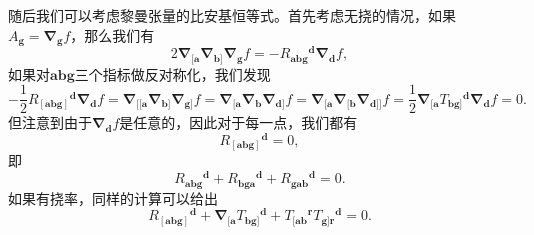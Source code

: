 随后我们可以考虑黎曼张量的比安基恒等式。首先考虑无挠的情况，如果$A_{\boldsymbol{g}} =\boldsymbol{\nabla }_{\boldsymbol{g}} f$，那么我们有
\begin{equation*}
	2\boldsymbol{\nabla }_{[\boldsymbol{a}}\boldsymbol{\nabla }_{\boldsymbol{b}]}\boldsymbol{\nabla }_{\boldsymbol{g}} f=-R{_{\boldsymbol{abg}}}^{\boldsymbol{d}}\boldsymbol{\nabla }_{\boldsymbol{d}} f,
\end{equation*}
如果对$\boldsymbol{abg}$三个指标做反对称化，我们发现
\begin{equation*}
	-\frac{1}{2} R{_{[\boldsymbol{abg}]}}^{\boldsymbol{d}}\boldsymbol{\nabla }_{\boldsymbol{d}} f=\boldsymbol{\nabla }_{[[\boldsymbol{a}}\boldsymbol{\nabla }_{\boldsymbol{b}]}\boldsymbol{\nabla }_{\boldsymbol{g}]} f=\boldsymbol{\nabla }_{[\boldsymbol{a}}\boldsymbol{\nabla }_{\boldsymbol{b}}\boldsymbol{\nabla }_{\boldsymbol{d}]} f=\boldsymbol{\nabla }_{[\boldsymbol{a}}\boldsymbol{\nabla }_{[\boldsymbol{b}}\boldsymbol{\nabla }_{\boldsymbol{d}]]} f=\frac{1}{2}\boldsymbol{\nabla }_{[\boldsymbol{a}} T{_{\boldsymbol{bg}]}}^{\boldsymbol{d}}\boldsymbol{\nabla }_{\boldsymbol{d}} f=0.
\end{equation*}
但注意到由于$\boldsymbol{\nabla }_{\boldsymbol{d}} f$是任意的，因此对于每一点，我们都有
\begin{equation}
	R{_{[\boldsymbol{abg}]}}^{\boldsymbol{d}} =0,
	\label{eq:5.7}
\end{equation}
即
\begin{equation*}
	R{_{\boldsymbol{abg}}}^{\boldsymbol{d}} +R{_{\boldsymbol{bga}}}^{\boldsymbol{d}} +R{_{\boldsymbol{gab}}}^{\boldsymbol{d}} =0.
\end{equation*}
如果有挠率，同样的计算可以给出
\begin{equation}
	R{_{[\boldsymbol{abg}]}}^{\boldsymbol{d}} +\boldsymbol{\nabla }_{[\boldsymbol{a}} T{_{\boldsymbol{bg}]}}^{\boldsymbol{d}} +T{_{[\boldsymbol{ab}}}^{\boldsymbol{r}} T{_{\boldsymbol{g}]\boldsymbol{r}}}^{\boldsymbol{d}} =0.
	\label{eq:5.8}
\end{equation}

